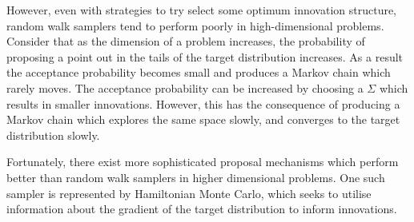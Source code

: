However, even with strategies to try select some optimum innovation structure, random walk
samplers tend to perform poorly in high-dimensional problems. Consider that as the
dimension of a problem increases, the probability of proposing a point out in the tails of
the target distribution increases. As a result the acceptance probability becomes small and
produces a Markov chain which rarely moves. The acceptance probability can be increased
by choosing a $\Sigma$ which results in smaller innovations. However, this has the
consequence of producing a Markov chain which explores the same space slowly, and
converges to the target distribution slowly.

Fortunately, there exist more sophisticated proposal mechanisms which perform better than
random walk samplers in higher dimensional problems. One such sampler is represented by
Hamiltonian Monte Carlo, which seeks to utilise information about the gradient of the
target distribution to inform innovations.

%
%
%
%

